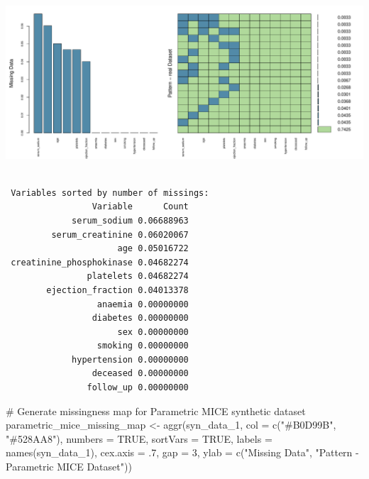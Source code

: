 \documentclass[
  letterpaper,
  DIV=11,
  numbers=noendperiod]{scrartcl}
\newenvironment{Shaded}{\begin{snugshade}}{\end{snugshade}}
\newcommand{\AttributeTok}[1]{\textcolor[rgb]{0.40,0.45,0.13}{#1}}
\newcommand{\CommentTok}[1]{\textcolor[rgb]{0.37,0.37,0.37}{#1}}
\newcommand{\ConstantTok}[1]{\textcolor[rgb]{0.56,0.35,0.01}{#1}}
\newcommand{\DecValTok}[1]{\textcolor[rgb]{0.68,0.00,0.00}{#1}}
\newcommand{\FunctionTok}[1]{\textcolor[rgb]{0.28,0.35,0.67}{#1}}
\newcommand{\NormalTok}[1]{\textcolor[rgb]{0.00,0.23,0.31}{#1}}
\newcommand{\OtherTok}[1]{\textcolor[rgb]{0.00,0.23,0.31}{#1}}
\newcommand{\StringTok}[1]{\textcolor[rgb]{0.13,0.47,0.30}{#1}}
\begin{document}
\begin{center}
\includegraphics[width=1\linewidth,height=\textheight,keepaspectratio]{heart_failure_synthetic_data_project_files/figure-pdf/Missingness Maps-1.pdf}
\end{center}

\begin{verbatim}

 Variables sorted by number of missings: 
                 Variable      Count
             serum_sodium 0.06688963
         serum_creatinine 0.06020067
                      age 0.05016722
 creatinine_phosphokinase 0.04682274
                platelets 0.04682274
        ejection_fraction 0.04013378
                  anaemia 0.00000000
                 diabetes 0.00000000
                      sex 0.00000000
                  smoking 0.00000000
             hypertension 0.00000000
                 deceased 0.00000000
                follow_up 0.00000000
\end{verbatim}

\begin{Shaded}
\begin{Highlighting}[]
\CommentTok{\# Generate missingness map for Parametric MICE synthetic dataset}
\NormalTok{parametric\_mice\_missing\_map }\OtherTok{\textless{}{-}} \FunctionTok{aggr}\NormalTok{(syn\_data\_1, }\AttributeTok{col =} \FunctionTok{c}\NormalTok{(}\StringTok{"\#B0D99B"}\NormalTok{, }\StringTok{"\#528AA8"}\NormalTok{),}
                                    \AttributeTok{numbers =} \ConstantTok{TRUE}\NormalTok{, }\AttributeTok{sortVars =} \ConstantTok{TRUE}\NormalTok{,}
                                    \AttributeTok{labels =} \FunctionTok{names}\NormalTok{(syn\_data\_1), }\AttributeTok{cex.axis =}\NormalTok{ .}\DecValTok{7}\NormalTok{,}
                                    \AttributeTok{gap =} \DecValTok{3}\NormalTok{, }\AttributeTok{ylab =} \FunctionTok{c}\NormalTok{(}\StringTok{"Missing Data"}\NormalTok{, }\StringTok{"Pattern {-} Parametric MICE Dataset"}\NormalTok{))}
\end{Highlighting}
\end{Shaded}
\end{document}
